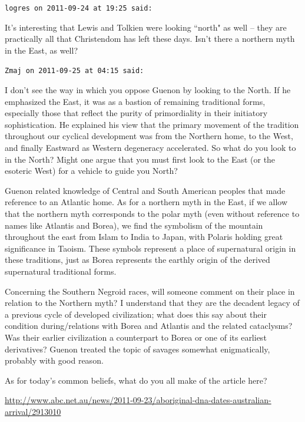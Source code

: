 \begin{footnotesize}\begin{sffamily}



\texttt{logres on 2011-09-24 at 19:25 said: }

It's interesting that Lewis and Tolkien were looking ``north" as well – they are practically all that Christendom has left these days. Isn't there a northern myth in the East, as well?


\hfill

\texttt{Zmaj on 2011-09-25 at 04:15 said: }

I don't see the way in which you oppose Guenon by looking to the North. If he emphasized the East, it was as a bastion of remaining traditional forms, especially those that reflect the purity of primordiality in their initiatory sophistication. He explained his view that the primary movement of the tradition throughout our cyclical development was from the Northern home, to the West, and finally Eastward as Western degeneracy accelerated. So what do you look to in the North? Might one argue that you must first look to the East (or the esoteric West) for a vehicle to guide you North?

Guenon related knowledge of Central and South American peoples that made reference to an Atlantic home. As for a northern myth in the East, if we allow that the northern myth corresponds to the polar myth (even without reference to names like Atlantis and Borea), we find the symbolism of the mountain throughout the east from Islam to India to Japan, with Polaris holding great significance in Taoism. These symbols represent a place of supernatural origin in these traditions, just as Borea represents the earthly origin of the derived supernatural traditional forms.

Concerning the Southern Negroid races, will someone comment on their place in relation to the Northern myth? I understand that they are the decadent legacy of a previous cycle of developed civilization; what does this say about their condition during/relations with Borea and Atlantis and the related cataclysms? Was their earlier civilization a counterpart to Borea or one of its earliest derivatives? Guenon treated the topic of savages somewhat enigmatically, probably with good reason.

As for today's common beliefs, what do you all make of the article here?

\url{http://www.abc.net.au/news/2011-09-23/aboriginal-dna-dates-australian-arrival/2913010}



\end{sffamily}
\end{footnotesize}
